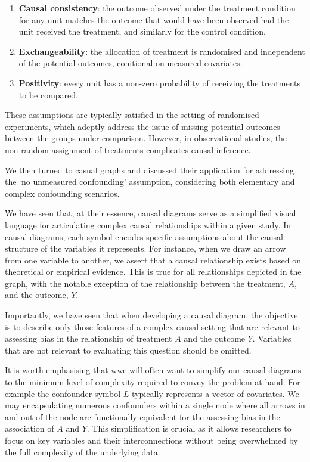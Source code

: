 \documentclass[
  singlecolumn]{article}
\begin{document}
\begin{enumerate}
\def\labelenumi{\arabic{enumi}.}
\item
  \textbf{Causal consistency}: the outcome observed under the treatment
  condition for any unit matches the outcome that would have been
  observed had the unit received the treatment, and similarly for the
  control condition.
\item
  \textbf{Exchangeability}: the allocation of treatment is randomised
  and independent of the potential outcomes, conitional on measured
  covariates.
\item
  \textbf{Positivity}: every unit has a non-zero probability of
  receiving the treatments to be compared.
\end{enumerate}

These assumptions are typically satisfied in the setting of randomised
experiments, which adeptly address the issue of missing potential
outcomes between the groups under comparison. However, in observational
studies, the non-random assignment of treatments complicates causal
inference.

We then turned to casual graphs and discussed their application for
addressing the `no unmeasured confounding' assumption, considering both
elementary and complex confounding scenarios.

We have seen that, at their essence, causal diagrams serve as a
simplified visual language for articulating complex causal relationships
within a given study. In causal diagrams, each symbol encodes specific
assumptions about the causal structure of the variables it represents.
For instance, when we draw an arrow from one variable to another, we
assert that a causal relationship exists based on theoretical or
empirical evidence. This is true for all relationships depicted in the
graph, with the notable exception of the relationship between the
treatment, \(A\), and the outcome, \(Y\).

Importantly, we have seen that when developing a causal diagram, the
objective is to describe only those features of a complex causal setting
that are relevant to assessing bias in the relationship of treatment
\(A\) and the outcome \(Y\). Variables that are not relevant to
evaluating this question should be omitted.

It is worth emphasising that wwe will often want to simplify our causal
diagrams to the minimum level of complexity required to convey the
problem at hand. For example the confounder symbol \(L\) typically
represents a vector of covariates. We may encapsulating numerous
confounders within a single node where all arrows in and out of the node
are functionally equivalent for the assessing bias in the association of
\(A\) and \(Y\). This simplification is crucial as it allows researchers
to focus on key variables and their interconnections without being
overwhelmed by the full complexity of the underlying data.
\end{document}
